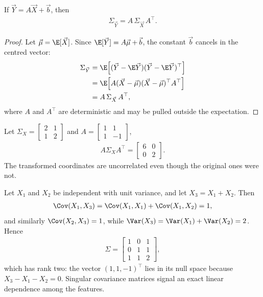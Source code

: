 \documentclass[a4paper, 12pt]{book}
\begin{document}
\begin{proposition}
    If $\vec{Y}=A \vec{X}+\vec{b}$, then
    \begin{align}
        \Sigma_{\vec{Y}}
        = A\,\Sigma_{\vec{X}}\,A^\top.
    \end{align}
\end{proposition}
\begin{proof}
    Let $\vec\mu=\E[\vec X]$. Since $\E[\vec Y]=A\vec\mu+\vec b$, the constant $\vec b$ cancels in the centred vector:
    \begin{align}
        \Sigma_{\vec Y}&=\E\!\left[(\vec Y-\E\vec Y)(\vec Y-\E\vec Y)^\top\right]\\
        &=\E\!\left[A(\vec X-\vec\mu)(\vec X-\vec\mu)^\top A^\top\right]\\
        &=A\,\Sigma_{\vec X}\,A^\top,
    \end{align}
    where $A$ and $A^\top$ are deterministic and may be pulled outside the expectation.
\end{proof}

\begin{example}
    Let
    $\Sigma_{X}=\begin{bmatrix}2&1\\1&2\end{bmatrix}$
    and $A=\begin{bmatrix}1&1\\1&-1\end{bmatrix}$,
    \begin{align}
        A\Sigma_{X}A^\top
        = \begin{bmatrix}6&0\\0&2\end{bmatrix}.
    \end{align}
    The transformed coordinates are uncorrelated even though the original ones
    were not.
\end{example}

\begin{example}
    Let $X_1$ and $X_2$ be independent with unit variance, and let
    $X_3=X_1+X_2$. Then
    \begin{align}
        \Cov(X_1,X_3)=\Cov(X_1,X_1)+\Cov(X_1,X_2)=1,
    \end{align}
    and similarly $\Cov(X_2,X_3)=1$, while
    $\Var(X_3)=\Var(X_1)+\Var(X_2)=2$. Hence
    \begin{align}
        \Sigma =
        \begin{bmatrix}1&0&1\\0&1&1\\1&1&2\end{bmatrix},
    \end{align}
    which has rank two: the vector $(1,1,-1)^\top$ lies in its null space because
    $X_3-X_1-X_2=0$. Singular covariance matrices signal an exact linear
    dependence among the features.
\end{example}
\end{document}

